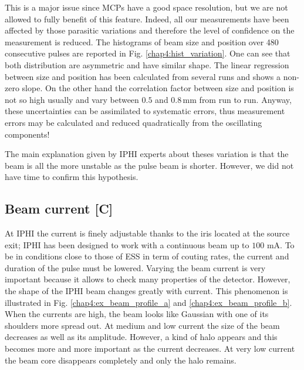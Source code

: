 \begin{refsection}
  This is a major issue since MCPs have a good space resolution, but we are not allowed to fully benefit of this feature. Indeed, all our measurements have been affected by those parasitic variations and therefore the level of confidence on the measurement is reduced. The histograms of beam size and position over 480 consecutive pulses are reported in Fig. \ref{chap4:hist_variation}. One can see that both distribution are asymmetric and have similar shape. The linear regression between size and position has been calculated from several runs and shows a non-zero slope. On the other hand the correlation factor between size and position is not so high usually and vary between $0.5$ and $0.8\,\mathrm{mm}$ from run to run.
  Anyway, these uncertainties can be assimilated to systematic errors, thus measurement errors may be calculated and reduced quadratically from the oscillating components!

  

  The main explanation given by IPHI experts about theses variation is that the beam is all the more unstable as the pulse beam is shorter. However, we did not have time to confirm this hypothesis.

  \subsection{Beam current [C]}
  At IPHI the current is finely adjustable thanks to the iris located at the source exit; IPHI has been designed to work with a continuous beam up to $100$ $\mathrm{mA}$. To be in conditions close to those of ESS in term of couting rates, the current and duration of the pulse must be lowered. Varying the beam current is very important because it allows to check many properties of the detector. However, the shape of the IPHI beam changes greatly with current. This phenomenon is illustrated in Fig. \ref{chap4:ex_beam_profile_a} and \ref{chap4:ex_beam_profile_b}. When the currents are high, the beam looks like Gaussian with one of its shoulders more spread out. At medium and low current the size of the beam decreases as well as its amplitude. However, a kind of halo appears and this becomes more and more important as the current decreases. At very low current the beam core disappears completely and only the halo remains.

  


\end{refsection}
